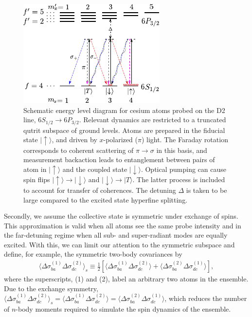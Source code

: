 \documentclass[preprint,aps,pra,onecolumn,superscriptaddress]{revtex4-1} %
\def\ket#1{\lvert{#1}\rangle}%
\newcommand{\expect}[1]{\big\langle #1 \big\rangle}
\begin{document}
\begin{figure}[htb]
\centering
  \includegraphics[width=.45\textwidth]{fig/FaradaySqueezingLevelStructure}
  \caption{Schematic energy level diagram for cesium atoms probed on the D2 line, $6S_{1/2} \rightarrow 6P_{3/2}$.  Relevant dynamics are restricted to a truncated qutrit subspace of ground levels.  Atoms are prepared in the fiducial state $\ket{\uparrow}$, and driven by $x$-polarized ($\pi$) light.  The Faraday rotation corresponds to coherent scattering of $\pi \rightarrow \sigma$ in this basis, and measurement backaction leads to entanglement between pairs of atom in $\ket{\uparrow}$ and the coupled state $\ket{\downarrow}$.  Optical pumping can cause spin flips $\ket{\uparrow} \rightarrow \ket{\downarrow}$ and $ \ket{\downarrow} \rightarrow  \ket{T}$.  The latter process is included to account for transfer of coherences.  The detuning $\Delta$ is taken to be large compared to the excited state hyperfine splitting.}
  \label{fig:spinsqueezinglevelstructure}
\end{figure}

Secondly, we assume the collective state is symmetric under exchange of spins. This approximation is valid when all atoms see the same probe intensity and in the far-detuning regime when all sub- and super-radiant modes are equally excited. With this, we can limit our attention to the symmetric subspace and define, for example, the symmetric two-body covariances by
\begin{align}
\expect{\Delta\sigma_{ba}^{(1)}\Delta\sigma_{dc}^{(2)}}_s \equiv \frac{1}{2}\left[\expect{\Delta\sigma_{ba}^{(1)}\Delta\sigma_{dc}^{(2)}}+\expect{\Delta\sigma_{ba}^{(2)}\Delta\sigma_{dc}^{(1)}} \right] ,
\end{align}
where the superscripts, (1) and (2), label an arbitrary two atoms in the ensemble. Due to the exchange symmetry, $ \expect{\Delta\sigma_{ba}^{(1)}\Delta\sigma_{dc}^{(2)}}_s=\expect{\Delta\sigma_{ba}^{(1)}\Delta\sigma_{dc}^{(2)}}=\expect{\Delta\sigma_{ba}^{(2)}\Delta\sigma_{dc}^{(1)}} $, which reduces the number of $ n $-body moments required to simulate the spin dynamics of the ensemble.
\end{document}
